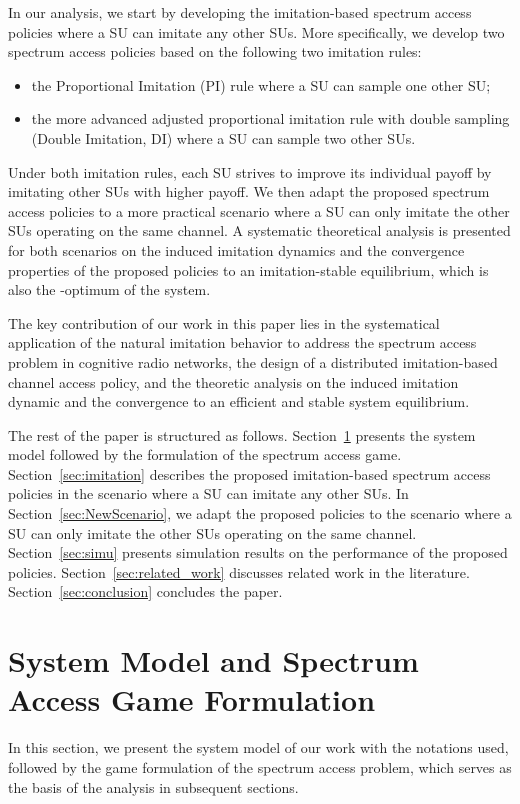 \documentclass[12pt, onecolumn]{IEEEtran}
\theoremstyle{plain}
\theoremstyle{definition}
\begin{document}
In our analysis, we start by developing the imitation-based spectrum access policies where a SU can imitate any other SUs. More specifically, we develop two spectrum access policies based on the following two imitation rules:
\begin{itemize}
\item the Proportional Imitation (PI) rule where a SU can sample one other SU;
\item the more advanced adjusted proportional imitation rule with double sampling (Double Imitation, DI) where a SU can sample two other SUs.
\end{itemize}
Under both imitation rules, each SU strives to improve its individual payoff by imitating other SUs with higher payoff. We then adapt the proposed spectrum access policies to a more practical scenario where a SU can only imitate the other SUs operating on the same channel. A systematic theoretical analysis is presented for both scenarios on the induced imitation dynamics and the convergence properties of the proposed policies to an imitation-stable equilibrium, which is also the -optimum of the system.

The key contribution of our work in this paper lies in the systematical application of the natural imitation behavior to address the spectrum access problem in cognitive radio networks, the design of a distributed imitation-based channel access policy, and the theoretic analysis on the induced imitation dynamic and the convergence to an efficient and stable system equilibrium.

The rest of the paper is structured as follows. Section~\ref{sec:models} presents the system model followed by the formulation of the spectrum access game. Section~\ref{sec:imitation} describes the proposed imitation-based spectrum access policies in the scenario where a SU can imitate any other SUs. In Section~\ref{sec:NewScenario}, we adapt the proposed policies to the scenario where a SU can only imitate the other SUs operating on the same channel. Section~\ref{sec:simu} presents simulation results on the performance of the proposed policies. Section~\ref{sec:related_work} discusses related work in the literature. Section~\ref{sec:conclusion} concludes the paper.

\section{System Model and Spectrum Access Game Formulation}
\label{sec:models}
In this section, we present the system model of our work with the notations used, followed by the game formulation of the spectrum access problem, which serves as the basis of the analysis in subsequent sections.
\end{document}
